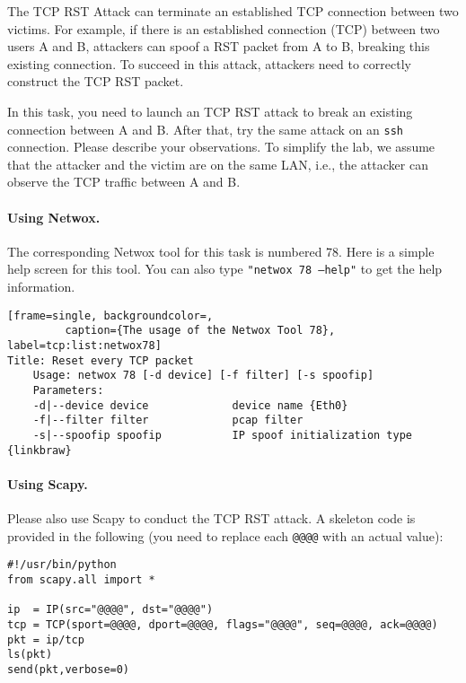 The TCP RST Attack can terminate an established TCP connection between
two victims. For example, if there is an established \telnet connection (TCP)
between two users A and B, attackers can spoof a RST packet from A to B,
breaking this existing connection. To succeed in this attack, attackers
need to correctly construct the TCP RST packet. 

In this task, you need to launch an TCP RST attack to break an existing 
\telnet connection between A and B. After that,
try the same attack on an {\tt ssh} connection. Please describe
your observations.  To simplify the lab,
we assume that the attacker and the victim are on the same LAN,
i.e., the attacker can observe the TCP traffic between
A and B.


\paragraph{Using Netwox.} 
The corresponding Netwox tool for this task is numbered 78. Here is a
simple help screen for this tool. You can also type {\tt "netwox 78 --help"}
to get the help information.

\begin{lstlisting}[frame=single, backgroundcolor=,
         caption={The usage of the Netwox Tool 78}, label=tcp:list:netwox78]
Title: Reset every TCP packet
    Usage: netwox 78 [-d device] [-f filter] [-s spoofip]
    Parameters:
    -d|--device device             device name {Eth0}
    -f|--filter filter             pcap filter
    -s|--spoofip spoofip           IP spoof initialization type {linkbraw}
\end{lstlisting}


\paragraph{Using Scapy.} Please also use Scapy to conduct the TCP RST attack. 
A skeleton code is provided in the following (you need to replace each
\texttt{@@@@} with an actual value):  


\begin{lstlisting}
#!/usr/bin/python
from scapy.all import *

ip  = IP(src="@@@@", dst="@@@@")
tcp = TCP(sport=@@@@, dport=@@@@, flags="@@@@", seq=@@@@, ack=@@@@)
pkt = ip/tcp
ls(pkt)
send(pkt,verbose=0)
\end{lstlisting}
 




